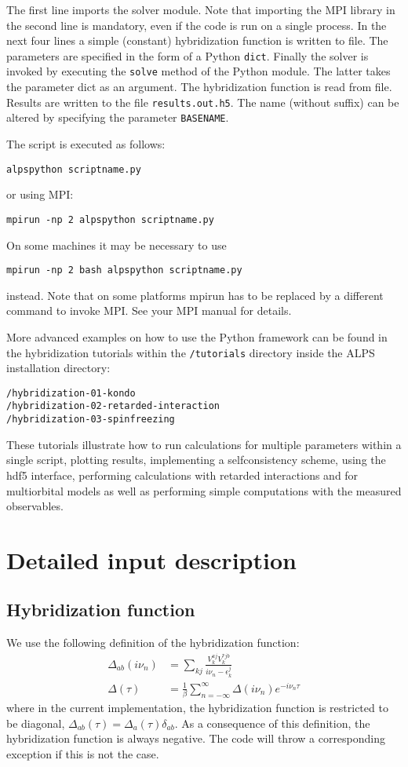 \documentclass[aps,prb,floatfix,superscriptaddress,twocolumn,notitlepage]{revtex4-1}
\newcommand{\iom}{{\ensuremath{i\nu}}}
\begin{document}
The first line imports the solver module. Note that importing the MPI library in the second line is mandatory, even if the code is run on a single process. In the next four lines a simple (constant) hybridization function is written to file.
The parameters are specified in the form of a Python \verb#dict#.
Finally the solver is invoked by executing the \verb#solve# method of the Python module. The latter takes the parameter dict as an argument. The hybridization function is read from file. Results are written to the file \verb#results.out.h5#. The name (without suffix) can be altered by specifying the parameter \verb#BASENAME#.

The script is executed as follows:
\begin{verbatim}
alpspython scriptname.py
\end{verbatim}
or using MPI:
\begin{verbatim}
mpirun -np 2 alpspython scriptname.py
\end{verbatim}
On some machines it may be necessary to use 
\begin{verbatim}
mpirun -np 2 bash alpspython scriptname.py
\end{verbatim}
instead.
Note that on some platforms mpirun has to be replaced by a different command to invoke MPI. See your MPI manual for details. 

More advanced examples on how to use the Python framework can be found in the hybridization tutorials within the \verb#/tutorials# directory inside the ALPS installation directory:
\begin{verbatim}
/hybridization-01-kondo
/hybridization-02-retarded-interaction
/hybridization-03-spinfreezing
\end{verbatim}

These tutorials illustrate how to run calculations for multiple parameters within a single script, plotting results, implementing a selfconsistency scheme, using the hdf5 interface, performing calculations with retarded interactions and for multiorbital models as well as performing simple computations with the measured observables.

\section{Detailed input description}

\subsection{Hybridization function}
\label{hybridization}
We use the following definition of the hybridization function:
\begin{align}
\Delta_{ab}(\iom_{n}) &= \sum_{kj}\frac{V_{k}^{aj}V_{k}^{*jb}}{\iom_{n}-\epsilon_{k}^{j}}\\
\Delta(\tau) &= \frac{1}{\beta}\sum_{n=-\infty}^{\infty}\Delta(\iom_{n})e^{-\iom_{n}\tau}
\end{align}
where in the current implementation, the hybridization function is restricted to be diagonal, $\Delta_{ab}(\tau)=\Delta_{a}(\tau)\delta_{ab}$.
As a consequence of this definition, the hybridization function is always negative. The code will throw a corresponding exception if this is not the case.
\end{document}
